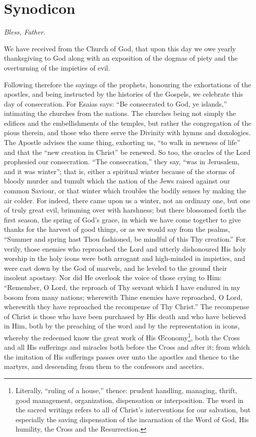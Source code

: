 \chapter{Synodicon}\label{ch:synodicon}
\emph{Bless, Father.}

We have received from the Church of God, that upon this day we owe yearly thanksgiving to God along with an exposition of the dogmas of piety and the overturning of the impieties of evil.

Following therefore the sayings of the prophets, honouring the exhortations of the apostles, and being instructed by the histories of the Gospels, we celebrate this day of consecration. For Esaias says: ``Be consecrated to God, ye islands,'' intimating the churches from the nations. The churches being not simply the edifices and the embellishments of the temples, but rather the congregation of the pious therein, and those who there serve the Divinity with hymns and doxologies. The Apostle advises the same thing, exhorting us, ``to walk in newness of life'' and that the ``new creation in Christ'' be renewed. So too, the oracles of the Lord prophesied our consecration. ``The consecration,'' they say, ``was in Jerusalem, and it was winter''; that is, either a spiritual winter because of the storms of bloody murder and tumult which the nation of the Jews raised against our common Saviour, or that winter which troubles the bodily senses by making the air colder. For indeed, there came upon us a winter, not an ordinary one, but one of truly great evil, brimming over with harshness; but there blossomed forth the first season, the spring of God's grace, in which we have come together to give thanks for the harvest of good things, or as we would say from the psalms, ``Summer and spring hast Thou fashioned, be mindful of this Thy creation.'' For verily, those enemies who reproached the Lord and utterly dishonoured His holy worship in the holy icons were both arrogant and high-minded in impieties, and were cast down by the God of marvels, and he leveled to the ground their insolent apostasy. Nor did He overlook the voice of those crying to Him: ``Remember, O Lord, the reproach of Thy servant which I have endured in my bosom from many nations; wherewith Thine enemies have reproached, O Lord, wherewith they have reproached the recompense of Thy Christ.'' The recompense of Christ is those who have been purchased by His death and who have believed in Him, both by the preaching of the word and by the representation in icons, whereby the redeemed know the great work of His \OE conomy\footnote{Literally, ``ruling of a house,'' thence: prudent handling, managing, thrift, good management, organization, dispensation or interposition. The word in the sacred writings refers to all of Christ's interventions for our salvation, but especially the saving dispensation of the incarnation of the Word of God, His humility, the Cross and the Resurrection.}, both the Cross and all His sufferings and miracles both before the Cross and after it; from which the imitation of His sufferings passes over unto the apostles and thence to the martyrs, and descending from them to the confessors and ascetics.

